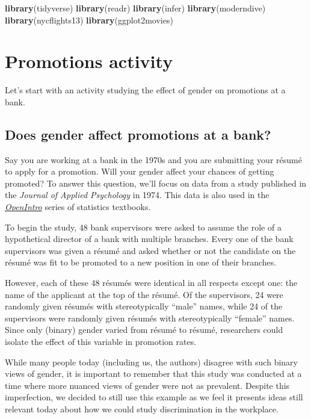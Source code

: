 \documentclass[
]{book}
\newenvironment{Shaded}{\begin{snugshade}}{\end{snugshade}}
\newcommand{\KeywordTok}[1]{\textcolor[rgb]{0.13,0.29,0.53}{\textbf{#1}}}
\newcommand{\NormalTok}[1]{#1}
\begin{document}
\begin{Shaded}
\begin{Highlighting}[]
\KeywordTok{library}\NormalTok{(tidyverse)}
\KeywordTok{library}\NormalTok{(readr)}
\KeywordTok{library}\NormalTok{(infer)}
\KeywordTok{library}\NormalTok{(moderndive)}
\KeywordTok{library}\NormalTok{(nycflights13)}
\KeywordTok{library}\NormalTok{(ggplot2movies)}
\end{Highlighting}
\end{Shaded}

\hypertarget{ht-activity}{%
\section{Promotions activity}\label{ht-activity}}

Let's start with an activity studying the effect of gender on promotions at a bank.

\hypertarget{does-gender-affect-promotions-at-a-bank}{%
\subsection{Does gender affect promotions at a bank?}\label{does-gender-affect-promotions-at-a-bank}}

Say you are working at a bank in the 1970s and you are submitting your résumé to apply for a promotion. Will your gender affect your chances of getting promoted? To answer this question, we'll focus on data from a study published in the \emph{Journal of Applied Psychology} in 1974. This data is also used in the \href{https://www.openintro.org/}{\emph{OpenIntro}} series of statistics textbooks.

To begin the study, 48 bank supervisors were asked to assume the role of a hypothetical director of a bank with multiple branches. Every one of the bank supervisors was given a résumé and asked whether or not the candidate on the résumé was fit to be promoted to a new position in one of their branches.

However, each of these 48 résumés were identical in all respects except one: the name of the applicant at the top of the résumé. Of the supervisors, 24 were randomly given résumés with stereotypically ``male'' names, while 24 of the supervisors were randomly given résumés with stereotypically ``female'' names. Since only (binary) gender varied from résumé to résumé, researchers could isolate the effect of this variable in promotion rates.

While many people today (including us, the authors) disagree with such binary views of gender, it is important to remember that this study was conducted at a time where more nuanced views of gender were not as prevalent. Despite this imperfection, we decided to still use this example as we feel it presents ideas still relevant today about how we could study discrimination in the workplace.
\end{document}
